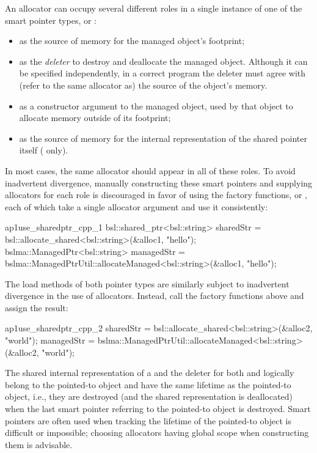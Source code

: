An allocator can occupy several different roles in a single instance of one of the
smart pointer types,  or :
\begin{itemize}
\item as the source of memory for the managed object’s footprint;
\item as the \emph{deleter} to destroy and deallocate the managed object. Although it
can be specified independently, in a correct program the deleter must
agree with (refer to the same allocator as) the source of the object’s
memory.
\item as a constructor argument to the managed object, used by that object to
allocate memory outside of its footprint;
\item as the source of memory for the internal representation of the shared
  pointer itself ( only).
\end{itemize}
In most cases, the same allocator should appear in all of these roles. To avoid
inadvertent divergence, manually constructing these smart pointers and
supplying allocators for each role is discouraged in favor of using the factory
functions,  or
, each of which take a single
allocator argument and use it consistently:
\begin{cppcodeblock}{ap1use_sharedptr_cpp_1}
    bsl::shared_ptr<bsl::string> sharedStr =
        bsl::allocate_shared<bsl::string>(&alloc1, "hello");
    bslma::ManagedPtr<bsl::string> managedStr =
        bslma::ManagedPtrUtil::allocateManaged<bsl::string>(&alloc1, "hello");
\end{cppcodeblock}
The load methods of both pointer types are similarly subject to inadvertent
divergence in the use of allocators. Instead, call the factory functions above and
assign the result:
\begin{cppcodeblock}{ap1use_sharedptr_cpp_2}
    sharedStr = bsl::allocate_shared<bsl::string>(&alloc2, "world");
    managedStr =
    bslma::ManagedPtrUtil::allocateManaged<bsl::string>(&alloc2, "world");
\end{cppcodeblock}
The shared internal representation of a  and the deleter for
both  and  logically belong to the pointed-to
object and have the same lifetime as the pointed-to object, i.e., they are
destroyed (and the shared representation is deallocated) when the last smart
pointer referring to the pointed-to object is destroyed. Smart pointers are often
used when tracking the lifetime of the pointed-to object is difficult or
impossible; choosing allocators having global scope when constructing them is
advisable.

